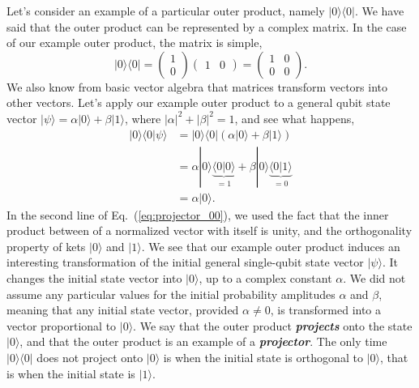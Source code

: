 Let's consider an example of a particular outer product, namely $|0\rangle\langle0|$.
We have said that the outer product can be represented by a complex matrix.
In the case of our example outer product, the matrix is simple,
\begin{equation}
    |0\rangle\langle0| = \begin{pmatrix} 1 \\ 0 \end{pmatrix} \begin{pmatrix} 1 & 0 \end{pmatrix} = \begin{pmatrix} 1 & 0 \\ 0 & 0 \end{pmatrix}.
\end{equation}
We also know from basic vector algebra that matrices transform vectors into other vectors.
Let's apply our example outer product to a general qubit state vector $|\psi\rangle = \alpha|0\rangle + \beta|1\rangle$, where $|\alpha|^2+|\beta|^2=1$, and see what happens,
\begin{align}
    |0\rangle\langle0|\psi\rangle & = |0\rangle\langle0| \left( \alpha|0\rangle + \beta|1\rangle \right) \label{eq:projector_00}\\
    & = \alpha |0\rangle\underbrace{\langle0|0\rangle}_{=1} + \beta |0\rangle\underbrace{\langle0|1\rangle}_{=0} \nonumber\\
    & = \alpha|0\rangle. \nonumber
\end{align}
In the second line of Eq.~(\ref{eq:projector_00}), we used the fact that the inner product between of a normalized vector with itself is unity, and the orthogonality property of kets $|0\rangle$ and $|1\rangle$.
We see that our example outer product induces an interesting transformation of the initial general single-qubit state vector $|\psi\rangle$.
It changes the initial state vector into $|0\rangle$, up to a complex constant $\alpha$.
We did not assume any particular values for the initial probability amplitudes $\alpha$ and $\beta$, meaning that any initial state vector, provided $\alpha\neq0$, is transformed into a vector proportional to $|0\rangle$.
We say that the outer product \textit{\textbf{projects}} onto the state $|0\rangle$, and that the outer product is an example of a \textit{\textbf{projector}}.
The only time $|0\rangle\langle0|$ does not project onto $|0\rangle$ is when the initial state is orthogonal to $|0\rangle$, that is when the initial state is $|1\rangle$.

